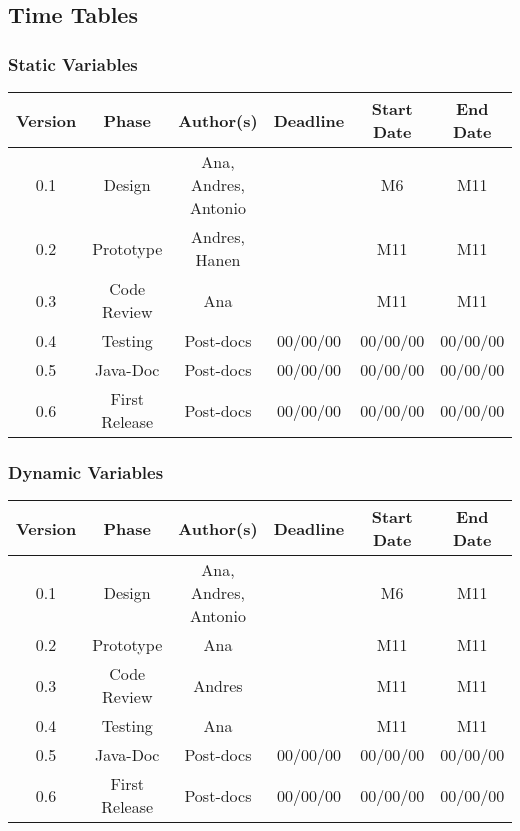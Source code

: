 \newpage
\subsection{Time Tables}

\subsubsection*{Static Variables}

\begin{table}[H]
\begin{tabular}{cccccc}
\hline
\textbf{Version} & \textbf{Phase} & \textbf{Author(s)} & \textbf{Deadline} & \textbf{Start Date} & \textbf{End Date}\\
\hline
0.1 & Design & Ana, Andres, Antonio &  & M6 & M11\\
\hline 
0.2 & Prototype & Andres, Hanen &  & M11 & M11\\
\hline 
0.3 & Code Review & Ana &  & M11 & M11\\
\hline 
0.4 & Testing & Post-docs & 00/00/00 & 00/00/00 & 00/00/00\\
\hline 
0.5 & Java-Doc  & Post-docs & 00/00/00 & 00/00/00 & 00/00/00\\
\hline 
0.6 & First Release & Post-docs & 00/00/00 & 00/00/00 & 00/00/00\\
\hline
\end{tabular}
\end{table}

\subsubsection*{Dynamic Variables}

\begin{table}[H]
\begin{tabular}{cccccc}
\hline
\textbf{Version} & \textbf{Phase} & \textbf{Author(s)} & \textbf{Deadline} & \textbf{Start Date} & \textbf{End Date}\\
\hline
0.1 & Design & Ana, Andres, Antonio &  & M6  & M11\\
\hline 
0.2 & Prototype & Ana &  & M11 & M11\\
\hline 
0.3 & Code Review & Andres &  & M11 & M11\\
\hline 
0.4 & Testing & Ana &  & M11 & M11\\
\hline 
0.5 & Java-Doc  & Post-docs & 00/00/00 & 00/00/00 & 00/00/00\\
\hline 
0.6 & First Release & Post-docs & 00/00/00 & 00/00/00 & 00/00/00\\
\hline
\end{tabular}
\end{table}

